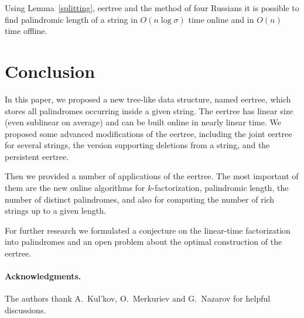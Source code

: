 \documentclass{llncs}
\begin{document}
\begin{conjecture}
Using Lemma~\ref{splitting}, eertree and the method of four Russians it is possible to find palindromic length of a string in $O(n\log\sigma)$ time online and in $O(n)$ time offline.
\end{conjecture}

\section{Conclusion}

In this paper, we proposed a new tree-like data structure, named eertree, which stores all palindromes occurring inside a given string. The eertree has linear size (even sublinear on average) and can be built online in nearly linear time. We proposed some advanced modifications of the eertree, including the joint eertree for several strings, the version supporting deletions from a string, and the persistent eertree.

Then we provided a number of applications of the eertree. The most important of them are the new online algorithms for $k$-factorization, palindromic length, the number of distinct palindromes, and also for computing the number of rich strings up to a given length.

For further research we formulated a conjecture on the linear-time factorization into palindromes and an open problem about the optimal construction of the eertree.

\paragraph*{Acknowledgments.} The authors thank A.~Kul'kov, O.~Merkuriev and G.~Nazarov for helpful discussions. 



\end{document}
